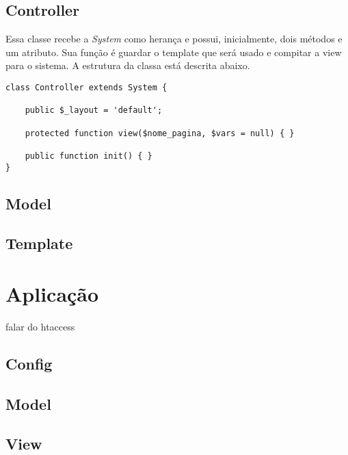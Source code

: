         \subsection{Controller\label{sub:system-controller}}
            Essa classe recebe a \emph{System} como herança e possui, inicialmente, dois métodos e um atributo. Sua função é guardar o template que será usado e compitar a view para o sistema. A estrutura da classa está descrita abaixo.


\begin{lstlisting}
class Controller extends System {

    public $_layout = 'default';

    protected function view($nome_pagina, $vars = null) { }

    public function init() { }
}
\end{lstlisting}



        \subsection{Model\label{sub:system-model}}

        \subsection{Template\label{sub:system-template}}


    \section{Aplicação\label{sec:app}}

        falar do htaccess

        \subsection{Config\label{sec:app-config}}

        \subsection{Model\label{sec:app-model}}

        \subsection{View\label{sec:app-view}}


